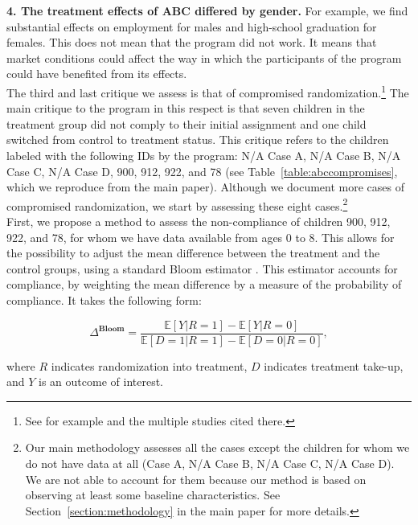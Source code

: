 \begin{appendices}
\noindent  \textbf{4. The treatment effects of ABC differed by gender.} For example, we find substantial effects on employment for males and high-school graduation for females. This does not mean that the program did not work. It means that market conditions could affect the way in which the participants of the program could have benefited from its effects.\\



\noindent The third and last critique we assess is that of compromised randomization.\footnote{See for example \citet{Baumeister-Bacharach_2000_Early-Generic} and the multiple studies cited there.} The main critique to the program in this respect is that seven children in the treatment group did not comply to their initial assignment and one child switched from control to treatment status. This critique refers to the children labeled with the following IDs by the program: N/A Case A, N/A Case B, N/A Case C, N/A Case D, 900, 912, 922, and 78 (see Table~\ref{table:abccompromises}, which we reproduce from the main paper). Although we document more cases of compromised randomization, we start by assessing these eight cases.\footnote{Our main methodology assesses all the cases except the children for whom we do not have data at all (Case A, N/A Case B, N/A Case C, N/A Case D). We are not able to account for them because our method is based on observing at least some baseline characteristics. See Section~\ref{section:methodology} in the main paper for more details.}\\

\noindent First, we propose a method to assess the non-compliance of children 900, 912, 922, and 78, for whom we have data available from ages 0 to 8. This allows for the possibility to adjust the mean difference between the treatment and the control groups, using a standard Bloom estimator \citep{Bloom_1984_ER}. This estimator accounts for compliance, by weighting the mean difference by a measure of the probability of compliance. It takes the following form: 

\begin{equation}
\Delta^{\textbf{Bloom}} = \frac{\mathbb{E} \left[ Y | R = 1 \right] - \mathbb{E} \left[ Y | R = 0 \right] }{\mathbb{E} \left[ D = 1 | R = 1 \right] - \mathbb{E} \left[ D = 0 | R = 0 \right]}, 
\end{equation}

\noindent where $R$ indicates randomization into treatment, $D$ indicates treatment take-up, and $Y$ is an outcome of interest.\\


\end{appendices}
